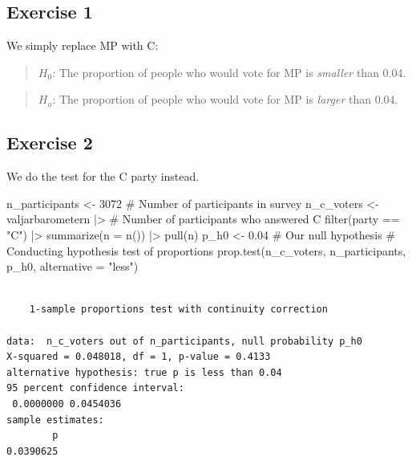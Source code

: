 \documentclass[
  letterpaper,
  DIV=11,
  numbers=noendperiod]{scrreprt}
\newenvironment{Shaded}{\begin{snugshade}}{\end{snugshade}}
\newcommand{\AttributeTok}[1]{\textcolor[rgb]{0.40,0.45,0.13}{#1}}
\newcommand{\CommentTok}[1]{\textcolor[rgb]{0.37,0.37,0.37}{#1}}
\newcommand{\DecValTok}[1]{\textcolor[rgb]{0.68,0.00,0.00}{#1}}
\newcommand{\FloatTok}[1]{\textcolor[rgb]{0.68,0.00,0.00}{#1}}
\newcommand{\FunctionTok}[1]{\textcolor[rgb]{0.28,0.35,0.67}{#1}}
\newcommand{\NormalTok}[1]{\textcolor[rgb]{0.00,0.23,0.31}{#1}}
\newcommand{\OtherTok}[1]{\textcolor[rgb]{0.00,0.23,0.31}{#1}}
\newcommand{\SpecialCharTok}[1]{\textcolor[rgb]{0.37,0.37,0.37}{#1}}
\newcommand{\StringTok}[1]{\textcolor[rgb]{0.13,0.47,0.30}{#1}}
\begin{document}
\subsection{Exercise 1}\label{exercise-1-20}

We simply replace MP with C:

\begin{quote}
\textbf{\(H_0\)}: The proportion of people who would vote for MP is
\emph{smaller} than 0.04.
\end{quote}

\begin{quote}
\textbf{\(H_a\)}: The proportion of people who would vote for MP is
\emph{larger} than 0.04.
\end{quote}

\subsection{Exercise 2}\label{exercise-2-16}

We do the test for the C party instead.

\begin{Shaded}
\begin{Highlighting}[]
\NormalTok{n\_participants }\OtherTok{\textless{}{-}} \DecValTok{3072} \CommentTok{\# Number of participants in survey}
\NormalTok{n\_c\_voters }\OtherTok{\textless{}{-}}\NormalTok{ valjarbarometern }\SpecialCharTok{|\textgreater{}} \CommentTok{\# Number of participants who answered C}
  \FunctionTok{filter}\NormalTok{(party }\SpecialCharTok{==} \StringTok{"C"}\NormalTok{) }\SpecialCharTok{|\textgreater{}}
  \FunctionTok{summarize}\NormalTok{(}\AttributeTok{n =} \FunctionTok{n}\NormalTok{()) }\SpecialCharTok{|\textgreater{}}
  \FunctionTok{pull}\NormalTok{(n)}
\NormalTok{p\_h0 }\OtherTok{\textless{}{-}} \FloatTok{0.04} \CommentTok{\# Our null hypothesis}
\CommentTok{\# Conducting hypothesis test of proportions}
\FunctionTok{prop.test}\NormalTok{(n\_c\_voters, n\_participants, p\_h0, }\AttributeTok{alternative =} \StringTok{"less"}\NormalTok{)}
\end{Highlighting}
\end{Shaded}

\begin{verbatim}

    1-sample proportions test with continuity correction

data:  n_c_voters out of n_participants, null probability p_h0
X-squared = 0.048018, df = 1, p-value = 0.4133
alternative hypothesis: true p is less than 0.04
95 percent confidence interval:
 0.0000000 0.0454036
sample estimates:
        p 
0.0390625 
\end{verbatim}
\end{document}
